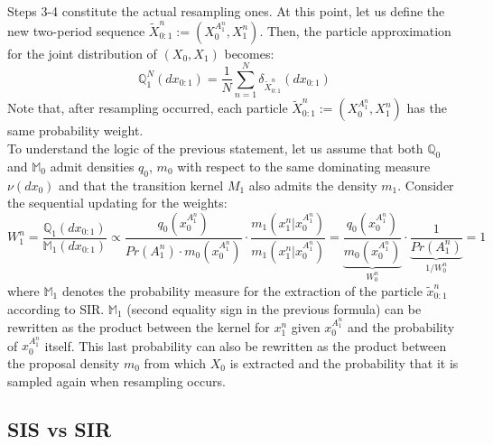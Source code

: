 \documentclass[
]{book}
\theoremstyle{break}
\theoremstyle{nonumberplain}
\begin{document}
Steps 3-4 constitute the actual resampling ones. At this point, let us
define the new two-period sequence
\(\tilde X_{0:1}^n:=(X_0^{A_1^n},X_1^n)\). Then, the particle
approximation for the joint distribution of \((X_0,X_1)\) becomes:
\begin{equation*}
     \mathbb Q_{1}^N(dx_{0:1})=\frac{1}{N}\sum_{n=1}^N\delta_{\tilde X_{0:1}^n}(dx_{0:1})
\end{equation*} Note that, after resampling occurred, each particle
\(\tilde X_{0:1}^n:=(X_0^{A_1^n},X_1^n)\) has the same probability
weight.\\
To understand the logic of the previous statement, let us assume that
both \(\mathbb Q_0\) and \(\mathbb M_0\) admit densities \(q_0\),
\(m_0\) with respect to the same dominating measure \(\nu(dx_0)\) and
that the transition kernel \(M_1\) also admits the density \(m_1\).
Consider the sequential updating for the weights: \begin{equation}
    W^n_1=\frac{\mathbb Q_1(dx_{0:1})}{\mathbb M_1(dx_{0:1})}\propto \frac{q_0(x_0^{A_1^n})}{Pr(A_1^n)\cdot m_0(x_0^{A_1^n})}\cdot \frac{m_1(x_1^n|x_0^{A_1^n})}{m_1(x_1^n|x_0^{A_1^n})}
=\underbrace{\frac{q_0(x_0^{A_1^n})}{ m_0(x_0^{A_1^n})}}_{W_0^n}\cdot \underbrace{\frac{1}{Pr(A_1^n)}}_{1/W_0^n}=1\label{sis_update}
\end{equation} where \(\mathbb M_1\) denotes the probability measure for
the extraction of the particle \(\tilde x_{0:1}^n\) according to SIR.
\(\mathbb M_1\) (second equality sign in the previous formula) can be
rewritten as the product between the kernel for \(x_1^n\) given
\(x_0^{A_1^n}\) and the probability of \(x_0^{A_1^n}\) itself. This last
probability can also be rewritten as the product between the proposal
density \(m_0\) from which \(X_0\) is extracted and the probability that
it is sampled again when resampling occurs.

\subsection{SIS vs SIR}
\end{document}
